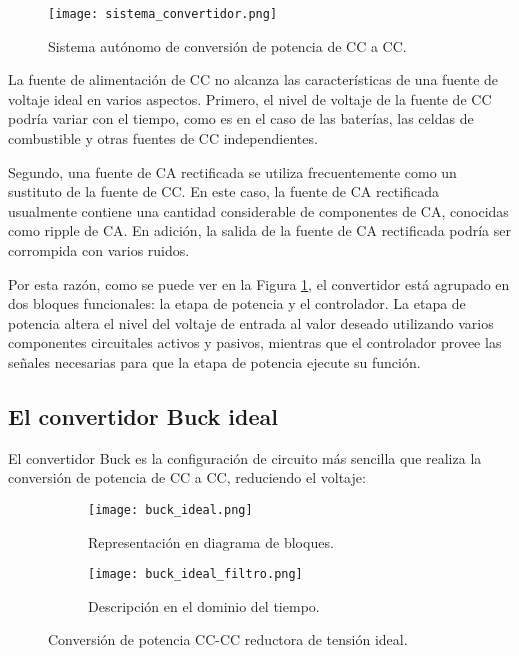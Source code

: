 \begin{figure}[H]
    \centering
    \texttt{[image: sistema\_convertidor.png]}
    \vspace{-0.25cm}
    \caption{Sistema autónomo de conversión de potencia de CC a CC.}
    \label{fig:sistema_convertidor}
\end{figure}
\vspace{-0.5cm}

La fuente de alimentación de CC no alcanza las características de una fuente de voltaje ideal en varios aspectos.
Primero, el nivel de voltaje de la fuente de CC podría variar con el tiempo, como es en el caso de las baterías, las celdas de combustible y otras
fuentes de CC independientes.

Segundo, una fuente de CA rectificada se utiliza frecuentemente como un sustituto de la fuente de CC. En este caso, la fuente de CA rectificada
usualmente contiene una cantidad considerable de componentes de CA, conocidas como ripple de CA. En adición, la salida de la fuente de CA rectificada
podría ser corrompida con varios ruidos.

Por esta razón, como se puede ver en la Figura \ref{fig:sistema_convertidor}, el convertidor está agrupado en dos bloques funcionales: la etapa de potencia
y el controlador. La etapa de potencia altera el nivel del voltaje de entrada al valor deseado utilizando varios componentes circuitales activos y pasivos,
mientras que el controlador provee las señales necesarias para que la etapa de potencia ejecute su función.

\vspace{-0.5cm}
\subsection{\textbf{El convertidor Buck ideal}}
\vspace{-0.5cm}
El convertidor Buck es la configuración de circuito más sencilla que realiza la conversión de potencia de CC a CC, reduciendo el voltaje:

\begin{figure}[H]
    \centering

    \begin{subfigure}[b]{\textwidth}
        \centering
        \texttt{[image: buck\_ideal.png]}
        \vspace{-0.25cm}
        \caption{Representación en diagrama de bloques.}
        \label{fig:buck_ideal_diagrama}
    \end{subfigure}
    \begin{subfigure}[b]{\textwidth}
        \centering
        \texttt{[image: buck\_ideal\_filtro.png]}
        \vspace{-0.25cm}
        \caption{Descripción en el dominio del tiempo.}
        \label{fig:buck_ideal_filtro}
    \end{subfigure}

    \vspace{-0.25cm}
    \caption{Conversión de potencia CC-CC reductora de tensión ideal.}
    \label{fig:buck_ideal}
\end{figure}
\vspace{-0.5cm}

